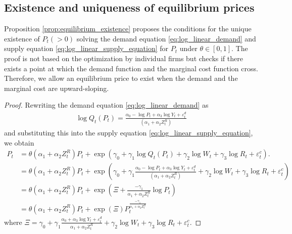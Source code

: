 \documentclass[11pt, a4paper]{article}
\theoremstyle{remark}
\begin{document}
\subsection{Existence and uniqueness of equilibrium prices}\label{sec:appendix_proof}

Proposition \ref{prop:equilibrium_existence} proposes the conditions for the unique existence of $P_{t}(>0)$ solving the demand equation \eqref{eq:log_linear_demand} and supply equation \eqref{eq:log_linear_supply_equation} for $P_{t}$ under $\theta\in[0,1]$.
The proof is not based on the optimization by individual firms but checks if there exists a point at which the demand function and the marginal cost function cross.
Therefore, we allow an equilibrium price to exist when the demand and the marginal cost are upward-sloping.
    
\begin{proof}
    
Rewriting the demand equation \eqref{eq:log_linear_demand} as 
\begin{align*}
    \log Q_{t}(P_{t})= \frac{\alpha_0 - \log P_{t} + \alpha_3 \log Y_t + \varepsilon^{d}_{t}}{(\alpha_1 + \alpha_2 Z^{R}_{t})}   
\end{align*}
and substituting this into the supply equation \eqref{eq:log_linear_supply_equation}, we obtain
\begin{align}
    P_t &=\theta (\alpha_1 + \alpha_2 Z^{R}_{t}) P_t + \exp\left(\gamma_0 + \gamma_1 \log Q_t(P_{t}) +  \gamma_2 \log W_{t} + \gamma_3 \log R_t + \varepsilon^{c}_{t}\right). \nonumber\\
    & = \theta(\alpha_1 + \alpha_2 Z^{R}_{t})P_t + \exp\left(\gamma_0 + \gamma_1 \frac{\alpha_0 - \log P_{t} + \alpha_3 \log Y_t + \varepsilon^{d}_{t}}{(\alpha_1 + \alpha_2 Z^{R}_{t})} +\gamma_2 \log W_{t} + \gamma_3 \log R_{t} + \varepsilon^{c}_{t} \right)\nonumber\\
    & = \theta(\alpha_1 + \alpha_2 Z^{R}_{t})P_t  + \exp\left(\Xi + \frac{-\gamma_1}{\alpha_1+\alpha_2 Z^{R}_t} \log P_t \right)\nonumber\\
    &= \theta(\alpha_1 + \alpha_2 Z^{R}_{t})P_t  + \exp(\Xi) P_t^{\frac{-\gamma_1}{\alpha_1 + \alpha_2 Z^{R}_{t}}} \label{eq:equilibrium_equation}
\end{align}
where $\Xi = \gamma_0 + \gamma_1\frac{\alpha_0 + \alpha_3 \log Y_t + \varepsilon^{d}_{t}}{\alpha_1 + \alpha_2 Z^{R}_{t}} +  \gamma_2 \log W_{t} + \gamma_3 \log R_t + \varepsilon^{c}_{t}$.


\end{proof}
\end{document}
